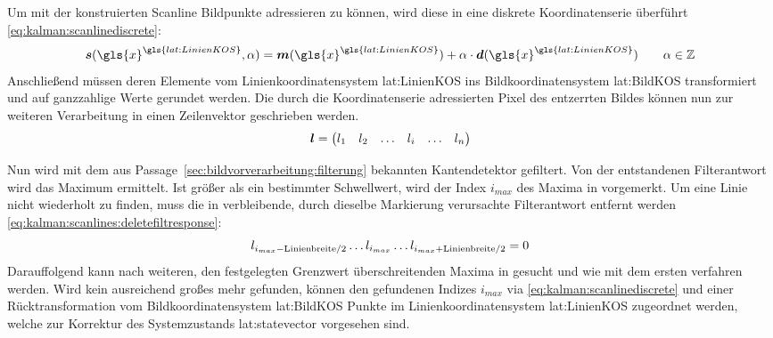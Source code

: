 Um mit der konstruierten Scanline Bildpunkte adressieren zu können, wird diese in eine diskrete Koordinatenserie überführt \eqref{eq:kalman:scanlinediscrete}:
\begin{equation}
\label{eq:kalman:scanlinediscrete}
\vct{s}(\gls{x}^{\gls{lat:LinienKOS}},\alpha) =
\vct{m}(\gls{x}^{\gls{lat:LinienKOS}})
  + \alpha \cdot \vct{d}(\gls{x}^{\gls{lat:LinienKOS}})
\qquad \alpha \in \mathbb{Z}
\end{equation}
Anschließend müssen deren Elemente vom Linienkoordinatensystem \gls{lat:LinienKOS} ins Bildkoordinatensystem \gls{lat:BildKOS} transformiert und auf ganzzahlige Werte gerundet werden.
Die durch die Koordinatenserie adressierten Pixel des entzerrten Bildes können nun zur weiteren Verarbeitung in einen Zeilenvektor  geschrieben werden. 
 \begin{equation}
 \boldsymbol{l} =
 \begin{pmatrix}
 l_1 & l_2 & \dots & l_i & \dots & l_n
 \end{pmatrix}
 \end{equation}
 
Nun wird  mit dem aus Passage~\ref{sec:bildvorverarbeitung:filterung} bekannten Kantendetektor gefiltert. Von der entstandenen Filterantwort  wird das Maximum  ermittelt. Ist  größer als ein bestimmter Schwellwert, wird der Index \begin{math} i_{max} \end{math} des Maxima in  vorgemerkt. Um eine Linie nicht wiederholt zu finden, muss die in  verbleibende, durch dieselbe Markierung verursachte Filterantwort entfernt werden \eqref{eq:kalman:scanlines:deletefiltresponse}:
\begin{equation}
\label{eq:kalman:scanlines:deletefiltresponse}
l_{i_{max}-\text{Linienbreite}/2} \dots l_{i_{max}} 
 \dots  l_{i_{max}+\text{Linienbreite}/2} = 0
 \end{equation}
Darauffolgend kann nach weiteren, den festgelegten Grenzwert überschreitenden Maxima in  gesucht und wie mit dem ersten  verfahren werden.
Wird kein ausreichend großes  mehr gefunden, können den gefundenen Indizes \begin{math} i_{max} \end{math} via \eqref{eq:kalman:scanlinediscrete} und einer Rücktransformation vom Bildkoordinatensystem \gls{lat:BildKOS} Punkte  im Linienkoordinatensystem \gls{lat:LinienKOS} zugeordnet werden, welche zur Korrektur des Systemzustands \gls{lat:statevector} vorgesehen sind.

